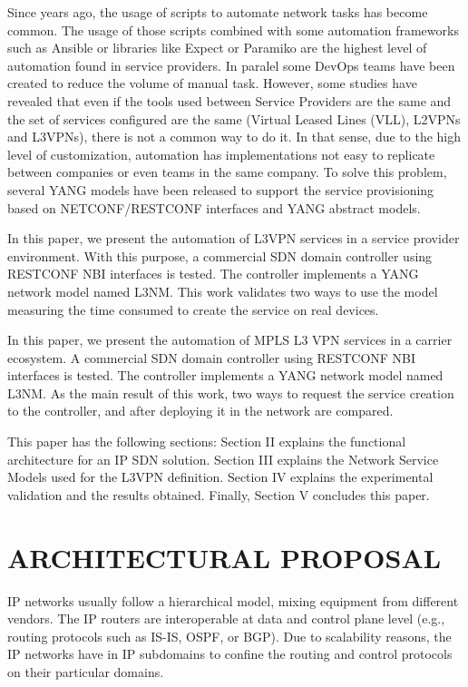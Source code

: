 \documentclass[conference]{IEEEtran}
\begin{document}
Since years ago, the usage of scripts to automate network tasks has become common. The usage of those scripts combined with some automation frameworks such as Ansible \cite{libes1995exploring} or libraries like Expect \cite{hochstein2017ansible} or Paramiko \cite{zadka2019paramiko} are the highest level of automation found in service providers. In paralel some DevOps teams have been created to reduce the volume of manual task. However, some studies have revealed that even if the tools used between Service Providers are the same and the set of services configured are the same (Virtual Leased Lines (VLL), L2VPNs and L3VPNs), there is not a common way to do it. In that sense, due to the high level of customization, automation has implementations not easy to replicate between companies or even teams in the same company. To solve this problem, several YANG models have been released to support the service provisioning based on NETCONF/RESTCONF \cite{enns2011network,bierman2017RESTCONF} interfaces and YANG \cite{bjorklund2016yang} abstract models. 

In this paper, we present the automation of L3VPN services in a service provider environment. With this purpose, a commercial SDN domain controller using RESTCONF NBI interfaces is tested. The controller implements a YANG network model named L3NM. This work validates two ways to use the model measuring the time consumed to create the service on real devices. 

In this paper, we present the automation of MPLS L3 VPN services in a carrier ecosystem. A commercial SDN domain controller using RESTCONF NBI interfaces is tested. The controller implements a YANG network model named L3NM.  As the main result of this work, two ways to request the service creation to the controller, and after deploying it in the network are compared.

This paper has the following sections: Section II explains the functional architecture for an IP SDN solution. Section III explains the Network Service Models used for the L3VPN definition. Section IV  explains the experimental validation and the results obtained. Finally, Section V concludes this paper. 

\section{ARCHITECTURAL PROPOSAL}

IP networks usually follow a hierarchical model, mixing equipment from different vendors. The IP routers are interoperable at data and control plane level (e.g., routing protocols such as IS-IS, OSPF, or BGP). Due to scalability reasons, the IP networks have in IP subdomains to confine the routing and control protocols on their particular domains.
\end{document}
